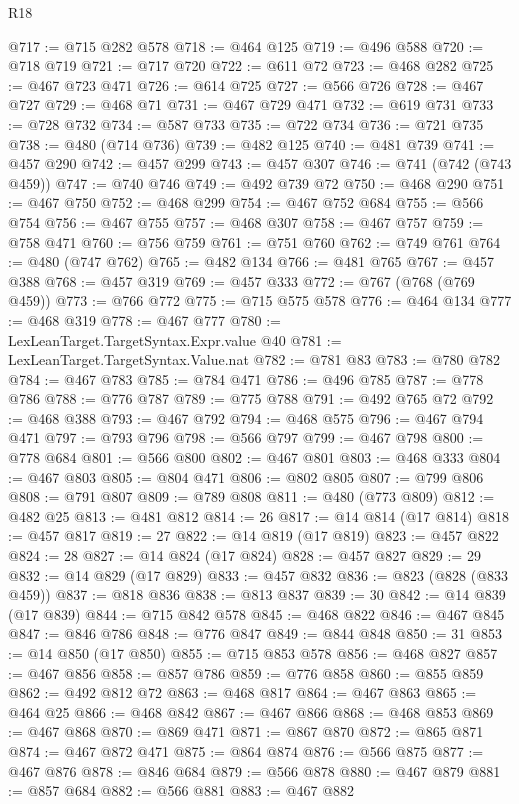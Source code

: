 \begin{lexlean}{R18}
\begin{coremodule}
{{{{{{{{{{{{{{{{{{{{{{{{{{{{{{{{{{{{{{{{{{{{{{{{{{{{{{{{{{{{{{{{{{{{{{{{{{{{{{{{{{{{{{{{{{{{{{{{{{{{{{{{{{{{{@717 := @715 @282 @578
@718 := @464 @125
@719 := @496 @588
@720 := @718 @719
@721 := @717 @720
@722 := @611 @72
@723 := @468 @282
@725 := @467 @723 @471
@726 := @614 @725
@727 := @566 @726
@728 := @467 @727
@729 := @468 @71
@731 := @467 @729 @471
@732 := @619 @731
@733 := @728 @732
@734 := @587 @733
@735 := @722 @734
@736 := @721 @735
@738 := @480 (@714 @736)
@739 := @482 @125
@740 := @481 @739
@741 := @457 @290
@742 := @457 @299
@743 := @457 @307
@746 := @741 (@742 (@743 @459))
@747 := @740 @746
@749 := @492 @739 @72
@750 := @468 @290
@751 := @467 @750
@752 := @468 @299
@754 := @467 @752 @684
@755 := @566 @754
@756 := @467 @755
@757 := @468 @307
@758 := @467 @757
@759 := @758 @471
@760 := @756 @759
@761 := @751 @760
@762 := @749 @761
@764 := @480 (@747 @762)
@765 := @482 @134
@766 := @481 @765
@767 := @457 @388
@768 := @457 @319
@769 := @457 @333
@772 := @767 (@768 (@769 @459))
@773 := @766 @772
@775 := @715 @575 @578
@776 := @464 @134
@777 := @468 @319
@778 := @467 @777
@780 := LexLeanTarget.TargetSyntax.Expr.value @40
@781 := LexLeanTarget.TargetSyntax.Value.nat
@782 := @781 @83
@783 := @780 @782
@784 := @467 @783
@785 := @784 @471
@786 := @496 @785
@787 := @778 @786
@788 := @776 @787
@789 := @775 @788
@791 := @492 @765 @72
@792 := @468 @388
@793 := @467 @792
@794 := @468 @575
@796 := @467 @794 @471
@797 := @793 @796
@798 := @566 @797
@799 := @467 @798
@800 := @778 @684
@801 := @566 @800
@802 := @467 @801
@803 := @468 @333
@804 := @467 @803
@805 := @804 @471
@806 := @802 @805
@807 := @799 @806
@808 := @791 @807
@809 := @789 @808
@811 := @480 (@773 @809)
@812 := @482 @25
@813 := @481 @812
@814 := 26
@817 := @14 @814 (@17 @814)
@818 := @457 @817
@819 := 27
@822 := @14 @819 (@17 @819)
@823 := @457 @822
@824 := 28
@827 := @14 @824 (@17 @824)
@828 := @457 @827
@829 := 29
@832 := @14 @829 (@17 @829)
@833 := @457 @832
@836 := @823 (@828 (@833 @459))
@837 := @818 @836
@838 := @813 @837
@839 := 30
@842 := @14 @839 (@17 @839)
@844 := @715 @842 @578
@845 := @468 @822
@846 := @467 @845
@847 := @846 @786
@848 := @776 @847
@849 := @844 @848
@850 := 31
@853 := @14 @850 (@17 @850)
@855 := @715 @853 @578
@856 := @468 @827
@857 := @467 @856
@858 := @857 @786
@859 := @776 @858
@860 := @855 @859
@862 := @492 @812 @72
@863 := @468 @817
@864 := @467 @863
@865 := @464 @25
@866 := @468 @842
@867 := @467 @866
@868 := @468 @853
@869 := @467 @868
@870 := @869 @471
@871 := @867 @870
@872 := @865 @871
@874 := @467 @872 @471
@875 := @864 @874
@876 := @566 @875
@877 := @467 @876
@878 := @846 @684
@879 := @566 @878
@880 := @467 @879
@881 := @857 @684
@882 := @566 @881
@883 := @467 @882
}}}}}}}}}}}}}}}}}}}}}}}}}}}}}}}}}}}}}}}}}}}}}}}}}}}}}}}}}}}}}}}}}}}}}}}}}}}}}}}}}}}}}}}}}}}}}}}}}}}}}}}}}}}}}
\end{coremodule}
\end{lexlean}
